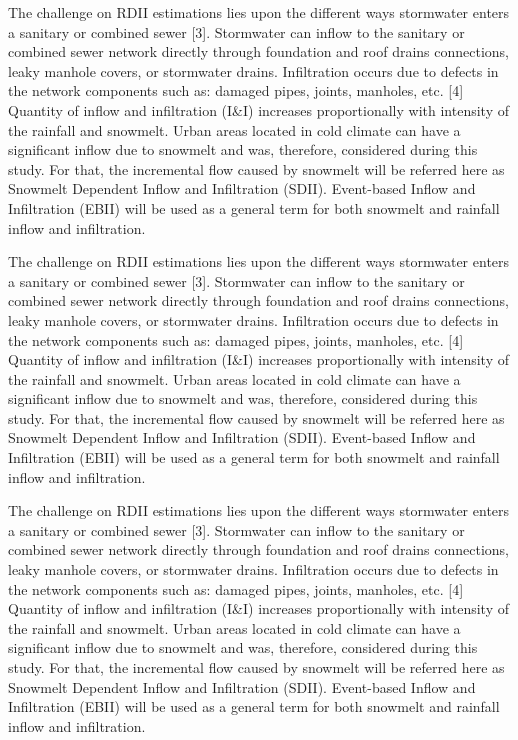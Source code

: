 The challenge on RDII estimations lies upon the different ways stormwater enters a sanitary or combined sewer [3]. Stormwater can inflow to the sanitary or combined sewer network directly through foundation and roof drains connections, leaky manhole covers, or stormwater drains.  Infiltration occurs due to defects in the network components such as: damaged pipes, joints, manholes, etc. [4]
Quantity of inflow and infiltration (I&I) increases proportionally with intensity of the rainfall and snowmelt. Urban areas located in cold climate can have a significant inflow due to snowmelt and was, therefore, considered during this study. For that, the incremental flow caused by snowmelt will be referred here as Snowmelt Dependent Inflow and Infiltration (SDII). Event-based Inflow and Infiltration (EBII) will be used as a general term for both snowmelt and rainfall inflow and infiltration.


The challenge on RDII estimations lies upon the different ways stormwater enters a sanitary or combined sewer [3]. Stormwater can inflow to the sanitary or combined sewer network directly through foundation and roof drains connections, leaky manhole covers, or stormwater drains.  Infiltration occurs due to defects in the network components such as: damaged pipes, joints, manholes, etc. [4]
Quantity of inflow and infiltration (I&I) increases proportionally with intensity of the rainfall and snowmelt. Urban areas located in cold climate can have a significant inflow due to snowmelt and was, therefore, considered during this study. For that, the incremental flow caused by snowmelt will be referred here as Snowmelt Dependent Inflow and Infiltration (SDII). Event-based Inflow and Infiltration (EBII) will be used as a general term for both snowmelt and rainfall inflow and infiltration.


The challenge on RDII estimations lies upon the different ways stormwater enters a sanitary or combined sewer [3]. Stormwater can inflow to the sanitary or combined sewer network directly through foundation and roof drains connections, leaky manhole covers, or stormwater drains.  Infiltration occurs due to defects in the network components such as: damaged pipes, joints, manholes, etc. [4]
Quantity of inflow and infiltration (I&I) increases proportionally with intensity of the rainfall and snowmelt. Urban areas located in cold climate can have a significant inflow due to snowmelt and was, therefore, considered during this study. For that, the incremental flow caused by snowmelt will be referred here as Snowmelt Dependent Inflow and Infiltration (SDII). Event-based Inflow and Infiltration (EBII) will be used as a general term for both snowmelt and rainfall inflow and infiltration.

